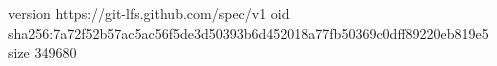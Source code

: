version https://git-lfs.github.com/spec/v1
oid sha256:7a72f52b57ac5ac56f5de3d50393b6d452018a77fb50369c0dff89220eb819e5
size 349680
